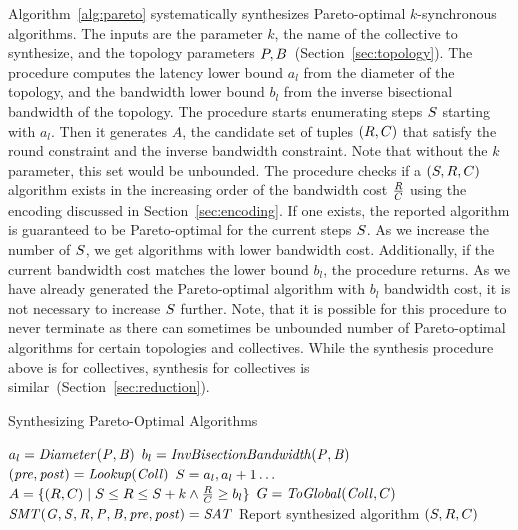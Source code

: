Algorithm~\ref{alg:pareto} systematically synthesizes Pareto-optimal
$k$-synchronous algorithms. The inputs are the parameter $k$, the name
of the collective to synthesize, and the topology parameters $P,
B$~(Section~\ref{sec:topology}). The procedure computes the latency
lower bound $a_l$ from the diameter of the topology, and the bandwidth
lower bound $b_l$ from the inverse bisectional bandwidth of the
topology. The procedure starts enumerating steps $S$ starting
with $a_l$. Then it generates $A$, the candidate set of tuples
$(R, C)$ that satisfy the round constraint and the inverse
bandwidth constraint. Note that without the $k$ parameter, this set
would be unbounded. The procedure checks if a
$(S,R,C)$ algorithm exists in the increasing order of
the bandwidth cost $\frac{R}{C}$ using the encoding
discussed in Section~\ref{sec:encoding}. If one exists, the reported
algorithm is guaranteed to be Pareto-optimal for the current steps
$S$. As we increase the number of $S$, we get algorithms
with lower bandwidth cost. Additionally, if the current bandwidth cost
matches the lower bound $b_l$, the procedure returns. As we have
already generated the Pareto-optimal algorithm with $b_l$ bandwidth
cost, it is not necessary to increase $S$ further. Note, that it
is possible for this procedure to never terminate as there can
sometimes be unbounded number of Pareto-optimal algorithms for certain
topologies and collectives. While the synthesis procedure above is for
\broadcasting collectives, synthesis for \reducing collectives is
similar~(Section~\ref{sec:reduction}).


\begin{algorithm}
	\caption{Synthesizing Pareto-Optimal Algorithms}
    \label{alg:pareto}
    \begin{algorithmic}[1]
        \State $a_l = \mathit{Diameter(P, B)}$ \State $b_l =
        \mathit{InvBisectionBandwidth(P, B)}$ \State $(\mathit{pre},
        \mathit{post}) = \mathit{Lookup(Coll)}$
         \For
        {$S=a_l,a_l+1\ldots$} \State $A = \{(R,C) \mid
        S \leq R \leq S+k \wedge
        \frac{R}{C} \geq b_l\}$  \State
        $G=\mathit{ToGlobal}(\mathit{Coll},C)$ \If
        {$\mathit{SMT(G, S, R, P, B, \mathit{pre},
        \mathit{post}) = SAT}$} \State Report synthesized algorithm
        $(S,R,C)$ 
         \EndIf {} \EndIf \EndFor
        \EndFor \EndProcedure
	\end{algorithmic}
\end{algorithm}
